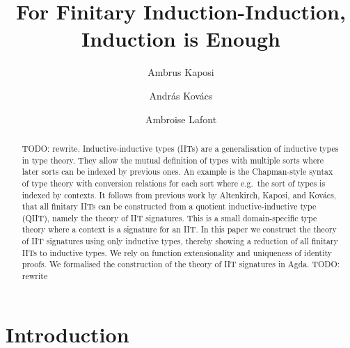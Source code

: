 \documentclass[a4paper,UKenglish,cleveref, autoref]{lipics-v2019}
\title{For Finitary Induction-Induction, \\ Induction is Enough} %
\author{Ambrus Kaposi}{E{\"o}tv{\"o}s Lor{\'a}nd University, Budapest, Hungary}{akaposi@inf.elte.hu}{https://orcid.org/0000-0001-9897-8936}{this author was supported by the National Research,
Development and Innovation Fund of Hungary, financed under the
Thematic Excellence Programme funding scheme, Project
no.\ ED18-1-2019-0030 (Application-specific highly reliable IT
solutions), by the New National Excellence Program of the Ministry
for Innovation and Technology, Project no.\ ÚNKP-19-4-ELTE-874, and
by the Bolyai Fellowship of the Hungarian Academy of Sciences,
Project no.\ BO/00659/19/3.}%
\author{Andr{\'a}s Kov{\'a}cs}{E{\"o}tv{\"o}s Lor{\'a}nd University, Budapest, Hungary}{kovacsandras@inf.elte.hu}{https://orcid.org/0000-0002-6375-9781}{this author was supported by the European Union, co-financed by the European Social Fund (EFOP-3.6.3-VEKOP-16-2017-00002).}
\author{Ambroise Lafont}{IMT Atlantique, Inria, LS2N CNRS, Nantes, France}{ambroise.lafont@inria.fr}{https://orcid.org/0000-0002-9299-641X}{}
\begin{document}

\begin{abstract}
  TODO: rewrite. Inductive-inductive types (IITs) are a generalisation of inductive types in
  type theory. They allow the mutual definition of types with multiple sorts
  where later sorts can be indexed by previous ones. An example is the
  Chapman-style syntax of type theory with conversion relations for each sort
  where e.g.\ the sort of types is indexed by contexts. It follows from previous
  work by Altenkirch, Kaposi, and Kov{\'a}cs, that all finitary IITs can be constructed from a quotient
  inductive-inductive type (QIIT), namely the theory of IIT signatures. This is
  a small domain-specific type theory where a context is a signature for an
  IIT. In this paper we construct the theory of IIT signatures using only inductive types,
  thereby showing a reduction of all finitary IITs to inductive types.  We rely
  on function extensionality and uniqueness of identity proofs. We formalised
  the construction of the theory of IIT signatures in Agda. TODO: rewrite
\end{abstract}


\section{Introduction}
\label{sec:intro}
\end{document}
